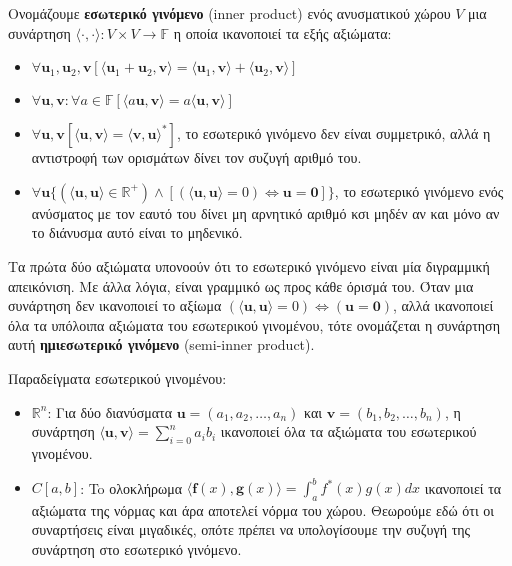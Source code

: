 \documentclass[main.tex]{subfiles}
\begin{document}
	\begin{definition}
		Ονομάζουμε \textbf{εσωτερικό γινόμενο} (inner product) ενός ανυσματικού χώρου $V$ μια συνάρτηση ${\langle\cdot,\cdot\rangle:V\times V \rightarrow \mathbb{F}}$ η οποία ικανοποιεί τα εξής αξιώματα:
		\begin{itemize}
			\item $\forall\boldsymbol{u}_1,\boldsymbol{u}_2,\boldsymbol{v}[\langle \boldsymbol{u}_1 + \boldsymbol{u}_2, \boldsymbol{v}\rangle = \langle\boldsymbol{u}_1,\boldsymbol{v}\rangle + \langle\boldsymbol{u}_2,\boldsymbol{v}\rangle]$
			\item $\forall\boldsymbol{u},\boldsymbol{v}:\forall a\in\mathbb{F}[\langle a\boldsymbol{u},\boldsymbol{v}\rangle = a\langle\boldsymbol{u},\boldsymbol{v}\rangle]$
			\item ${\forall\boldsymbol{u},\boldsymbol{v}[\langle\boldsymbol{u},\boldsymbol{v}\rangle = \langle\boldsymbol{v},\boldsymbol{u}\rangle^*]}$, το εσωτερικό γινόμενο δεν είναι συμμετρικό, αλλά η αντιστροφή των ορισμάτων δίνει τον συζυγή αριθμό του.
			\item $\forall\boldsymbol{u}\{(\langle\boldsymbol{u},\boldsymbol{u}\rangle \in \mathbb{R}^+)\wedge[(\langle\boldsymbol{u},\boldsymbol{u}\rangle = 0) \Leftrightarrow \boldsymbol{u} = \boldsymbol{0}]\}$, το εσωτερικό γινόμενο ενός ανύσματος με τον εαυτό του δίνει μη αρνητικό αριθμό κσι μηδέν αν και μόνο αν το διάνυσμα αυτό είναι το μηδενικό.
		\end{itemize}
	\end{definition}
	Τα πρώτα δύο αξιώματα υπονοούν ότι το εσωτερικό γινόμενο είναι μία διγραμμική απεικόνιση. Με άλλα λόγια, είναι γραμμικό ως προς κάθε όρισμά του. Όταν μια συνάρτηση δεν ικανοποιεί το αξίωμα $(\langle\boldsymbol{u},\boldsymbol{u}\rangle = 0) \Leftrightarrow (\boldsymbol{u} = \boldsymbol{0})$, αλλά ικανοποιεί όλα τα υπόλοιπα αξιώματα του εσωτερικού γινομένου, τότε ονομάζεται η συνάρτηση αυτή \textbf{ημιεσωτερικό γινόμενο} (semi-inner product).
	
	Παραδείγματα εσωτερικού γινομένου:
	\begin{itemize}
		\item $\mathbb{R}^n$: Για δύο διανύσματα ${\boldsymbol{u} = (a_1, a_2, \ldots, a_n)}$ και ${\boldsymbol{v} = (b_1, b_2, \ldots, b_n)}$, η συνάρτηση $\langle\boldsymbol{u},\boldsymbol{v}\rangle = \sum^n_{i=0}a_ib_i$ ικανοποιεί όλα τα αξιώματα του εσωτερικού γινομένου.
		\item $C[a,b]$: To ολοκλήρωμα ${\langle\boldsymbol{f}(x),\boldsymbol{g}(x)\rangle = \int^b_af^*(x)g(x)dx}$ ικανοποιεί τα αξιώματα της νόρμας και άρα αποτελεί νόρμα του χώρου. Θεωρούμε εδώ ότι οι συναρτήσεις είναι μιγαδικές, οπότε πρέπει να υπολογίσουμε την συζυγή της συνάρτηση στο εσωτερικό γινόμενο.
	\end{itemize}
	
\end{document}
